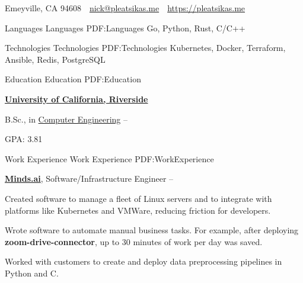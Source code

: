 \documentclass[letterpaper,MMMyyyy,nonstopmode]{simpleresumecv}
\newcommand{\CVAuthor}{Nick Pleatsikas}
\newcommand{\CVWebpage}{https://pleatsikas.me}
\begin{document}

\Title{\CVAuthor}

\begin{SubTitle}
Emeyville, CA 94608
\,\SubBulletSymbol\,
\href{mailto:nick@pleatsikas.me}
{nick@pleatsikas.me}
\,\SubBulletSymbol\,
\href{\CVWebpage}
{\url{\CVWebpage}}
\end{SubTitle}

\begin{Body}


\Section
{Languages}
{Languages}
{PDF:Languages}
\Entry
Go, Python, Rust, C/C++


\Section
{Technologies}
{Technologies}
{PDF:Technologies}
\Entry
Kubernetes, Docker, Terraform, Ansible, Redis, PostgreSQL


\Section
{Education}
{Education}
{PDF:Education}

\Entry
\href{https://ucr.edu}
{\textbf{University of California, Riverside}}

\Gap
\BulletItem
B.Sc., in
\href{https://www.engr.ucr.edu}
{Computer Engineering}
\hfill
{} --
\begin{Detail}
\SubBulletItem
GPA: 3.81
\end{Detail}


\Section
{Work\newline
Experience}
{Work Experience}
{PDF:WorkExperience}

\Entry
\href{https://minds.ai}
{\textbf{Minds.ai}},
Software/Infrastructure Engineer 
\hfill {} -- 
\Gap

\BulletItem
Created software to manage a fleet of Linux servers and to integrate with platforms 
like Kubernetes and VMWare, reducing friction for developers.
\Gap

\BulletItem
Wrote software to automate manual business tasks. For example, after deploying \\
\textbf{zoom-drive-connector}, up to 30 minutes of work per day was saved.
\Gap

\BulletItem
Worked with customers to create and deploy data preprocessing pipelines in Python and C. 
\Gap


\end{Body}
\end{document}
